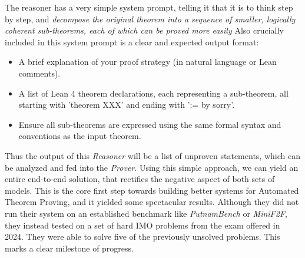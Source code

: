 \documentclass[12pt, letterpaper]{article}
\begin{document}
The reasoner has a very simple system prompt, telling it that it is to think step by step, and \textit{decompose the original theorem into a
sequence of smaller, logically coherent sub-theorems, each of which can be proved more easily} \citet{zhou2025solvingformalmathproblems}
Also crucially included in this system prompt is a clear and expected output format:

\begin{tcolorbox}[title=\textbf{Output Format for the Reasoner}]
    \begin{itemize}
        \item A brief explanation of your proof strategy (in natural language or Lean comments).
        \item A list of Lean 4 theorem declarations, each representing a sub-theorem, all starting with 'theorem XXX' and ending with ':= by sorry'.
        \item Ensure all sub-theorems are expressed using the same formal syntax and conventions as the input theorem.
    \end{itemize}
\end{tcolorbox} \citep{zhou2025solvingformalmathproblems}
Thus the output of this \textit{Reasoner} will be a list of unproven statements, which can be analyzed and fed into the \textit{Prover}. Using this simple approach, we can yield an entire end-to-end solution, that rectifies the negative aspect of both sets of models. This is the core first step towards building better systems for Automated Theorem Proving, and it yielded some spectacular results. Although they did not run their system on an established benchmark like \textit{PutnamBench} or \textit{MiniF2F}, they instead tested on a set of hard IMO problems from the exam offered in 2024. They were able to solve five of the previously unsolved problems. This marks a clear milestone of progress.

\end{document}
